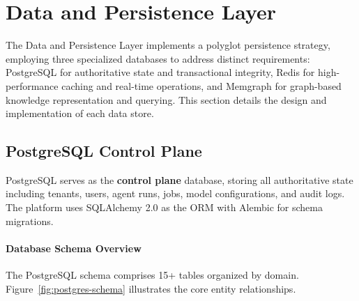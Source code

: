 
\section{Data and Persistence Layer}
\label{sec:data-layer}

The Data and Persistence Layer implements a polyglot persistence strategy, employing three specialized databases to address distinct requirements: PostgreSQL for authoritative state and transactional integrity, Redis for high-performance caching and real-time operations, and Memgraph for graph-based knowledge representation and querying. This section details the design and implementation of each data store.

\subsection{PostgreSQL Control Plane}
\label{subsec:postgresql}

PostgreSQL serves as the \textbf{control plane} database, storing all authoritative state including tenants, users, agent runs, jobs, model configurations, and audit logs. The platform uses SQLAlchemy 2.0 as the ORM with Alembic for schema migrations.

\paragraph{Database Schema Overview}
The PostgreSQL schema comprises 15+ tables organized by domain. Figure~\ref{fig:postgres-schema} illustrates the core entity relationships.

